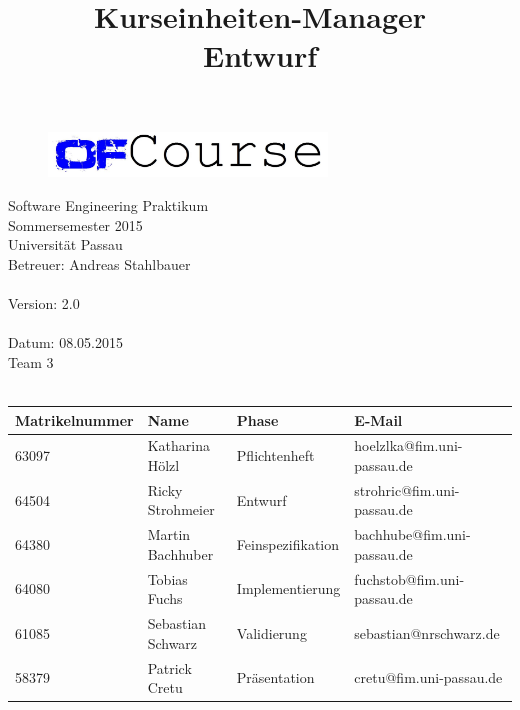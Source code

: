 \documentclass[a4paper, 12pt]{scrreprt}
\begin{document}
	\thispagestyle{plain}

\begin{titlepage}
    \begin{center}
        
        \begin{figure}[ht]
        	\centering
        	\includegraphics[width=0.66\textwidth, angle=0]{logo/name_blau_ofCourse.jpg}
        \end{figure}
        
    	\begin{title}
        	\title{\Huge{\textbf{Kurseinheiten-Manager \\ Entwurf\\}}}

		\end{title}
		\hspace{3cm}

        	Software Engineering Praktikum \\
        	Sommersemester 2015\\
        	Universität Passau\\


        	Betreuer: Andreas Stahlbauer \\
        	\hspace{1,5cm}\\
        	Version: 2.0 \\
        	\hspace{1,5cm}\\
        	Datum: 08.05.2015\\[50pt]
        	Team 3 \\
    
		    \ \\
        
        
        \begin{tabular}{ | l | l | l | l |}
            \hline
             \textbf{Matrikelnummer} & \textbf{Name} & \textbf{Phase} & \textbf{E-Mail}  \\ \hline
             63097 & Katharina Hölzl & Pflichtenheft & hoelzlka@fim.uni-passau.de \\ \hline
             64504 & Ricky Strohmeier& Entwurf & strohric@fim.uni-passau.de  \\ \hline
             64380 & Martin Bachhuber & Feinspezifikation  & bachhube@fim.uni-passau.de \\ \hline
             64080 & Tobias Fuchs & Implementierung  &  fuchstob@fim.uni-passau.de\\ \hline
             61085 & Sebastian Schwarz & Validierung & sebastian@nrschwarz.de \\ \hline  
             58379 & Patrick Cretu  &  Präsentation & cretu@fim.uni-passau.de \\ \hline
        \end{tabular}
        

\end{center}
\end{titlepage}
\end{document}

